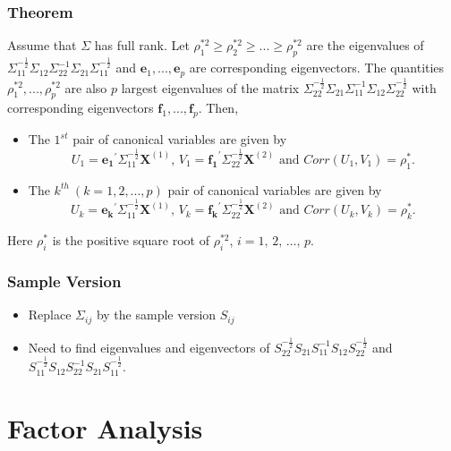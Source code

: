 \documentclass[10pt]{beamer} %
\begin{document}
\begin{frame}
	\frametitle{Theorem}
   Assume that $\Sigma$ has full rank. Let $\rho_1^{*2} \geq \rho_2^{*2} \geq ... \geq
   \rho_p^{*2}$ are the eigenvalues of
   $\Sigma_{11}^{-\frac{1}{2}}\Sigma_{12}\Sigma_{22}^{-1}\Sigma_{21}\Sigma_{11}^{-\frac{1}{2}}$
   and $\boldsymbol{e}_1,...,\boldsymbol{e}_p$ are corresponding eigenvectors.
   The quantities $\rho_1^{*2},...,\rho_p^{*2}$ are also $p$ largest eigenvalues of
   the matrix
   $\Sigma_{22}^{-\frac{1}{2}}\Sigma_{21}\Sigma_{11}^{-1}\Sigma_{12}\Sigma_{22}^{-\frac{1}{2}}$
   with corresponding eigenvectors $\boldsymbol{f}_1,...,\boldsymbol{f}_p$.
   Then,
   \begin{itemize}
      \item The $1^{st}$ pair of canonical variables are given by
         $$U_1=\boldsymbol{e_1}^{'}\Sigma_{11}^{-\frac{1}{2}}\boldsymbol{X}^{(1)},\,
         V_1=\boldsymbol{f_1}^{'}\Sigma_{22}^{-\frac{1}{2}}\boldsymbol{X}^{(2)}
         \text{ and } Corr(U_1,V_1)=\rho_1^*.$$
      \item The $k^{th}\ (k=1,2,...,p)$ pair of canonical variables are given by
         $$U_k=\boldsymbol{e_k}^{'}\Sigma_{11}^{-\frac{1}{2}}\boldsymbol{X}^{(1)},\,
         V_k=\boldsymbol{f_k}^{'}\Sigma_{22}^{-\frac{1}{2}}\boldsymbol{X}^{(2)}
         \text{ and } Corr(U_k,V_k)=\rho_k^*.$$
   \end{itemize}
   Here $\rho_i^*$ is the positive square root of $\rho_i^{*2}$,
   $i=1,\,2,\,\ldots,\,p$.
\end{frame}

\begin{frame}
   \frametitle{Sample Version}
   \begin{itemize}
      \item Replace $\Sigma_{ij}$ by the sample version $S_{ij}$
      \item Need to find eigenvalues and eigenvectors of $S_{22}^{-\frac{1}{2}}
         S_{21} S_{11}^{-1} S_{12} S_{22}^{-\frac{1}{2}}$ and $S_{11}^{-\frac{1}{2}}
         S_{12} S_{22}^{-1} S_{21} S_{11}^{-\frac{1}{2}}$.
   \end{itemize}
\end{frame}

\section{Factor Analysis}
\end{document}
